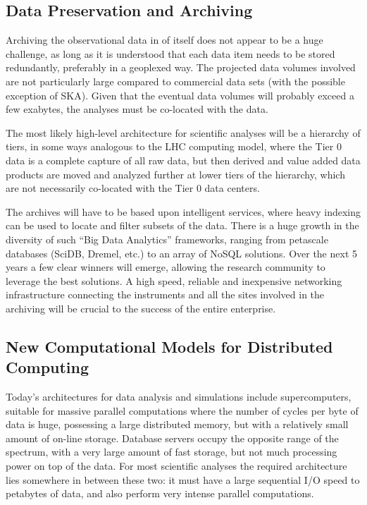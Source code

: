 \subsection{Data Preservation and Archiving} 

Archiving the observational data in of itself does not appear to be a
huge challenge, as long as it is understood that each data item needs
to be stored redundantly, preferably in a geoplexed way. The projected
data volumes involved are not particularly large compared to
commercial data sets (with the possible exception of SKA). Given that
the eventual data volumes will probably exceed a few exabytes, the
analyses must be co-located with the data.

The most likely high-level architecture for scientific analyses will
be a hierarchy of tiers, in some ways analogous to the LHC computing
model, where the Tier 0 data is a complete capture of all raw data,
but then derived and value added data products are moved and analyzed
further at lower tiers of the hierarchy, which are not necessarily
co-located with the Tier 0 data centers.

The archives will have to be based upon intelligent services, where
heavy indexing can be used to locate and filter subsets of the
data. There is a huge growth in the diversity of such ``Big Data
Analytics'' frameworks, ranging from petascale databases (SciDB,
Dremel, etc.) to an array of NoSQL solutions. Over the next 5 years a
few clear winners will emerge, allowing the research community to
leverage the best solutions. A high speed, reliable and
inexpensive networking infrastructure connecting the instruments and
all the sites involved in the archiving will be crucial to the success
of the entire enterprise.

\subsection{New Computational Models for Distributed Computing}

Today's architectures for data analysis and simulations include
supercomputers, suitable for massive parallel computations where the
number of cycles per byte of data is huge, possessing a large
distributed memory, but with a relatively small amount of on-line
storage. Database servers occupy the opposite range of the spectrum,
with a very large amount of fast storage, but not much processing
power on top of the data. For most scientific analyses the required
architecture lies somewhere in between these two: it must have a large
sequential I/O speed to petabytes of data, and also perform very
intense parallel computations. 

